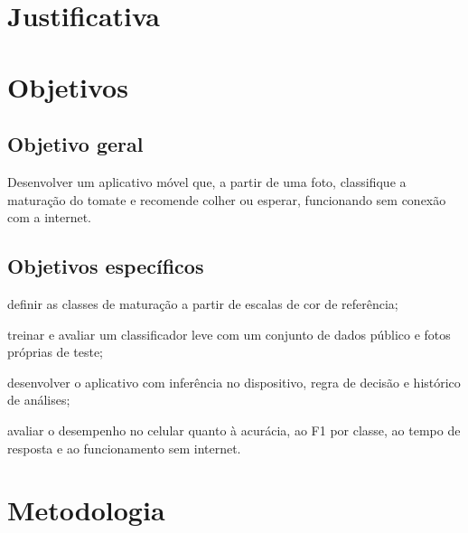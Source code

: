 \section{Justificativa}


\section{Objetivos}

\subsection{Objetivo geral}

Desenvolver um aplicativo móvel que, a partir de uma foto, classifique a maturação do tomate e recomende colher ou esperar, funcionando sem conexão com a internet.

\subsection{Objetivos específicos}

\begin{alineas}
  \item definir as classes de maturação a partir de escalas de cor de referência;
  \item treinar e avaliar um classificador leve com um conjunto de dados público e fotos próprias de teste;
  \item desenvolver o aplicativo com inferência no dispositivo, regra de decisão e histórico de análises;
  \item avaliar o desempenho no celular quanto à acurácia, ao F1 por classe, ao tempo de resposta e ao funcionamento sem internet.
\end{alineas}

\section{Metodologia}


